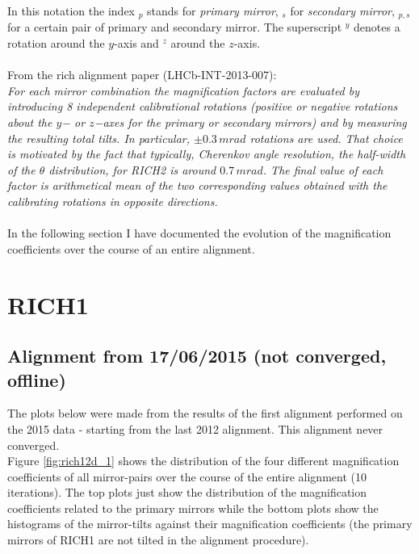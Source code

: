 In this notation the index $_p$ stands for \textit{primary mirror}, $_s$ for \textit{secondary mirror}, $_{p,s}$ for a certain pair of primary and secondary mirror. The superscript $^y$ denotes a rotation around the $y$-axis and $^z$ around the $z$-axis.\\
\\
From the rich alignment paper (LHCb-INT-2013-007):\\
\textit{For each mirror combination the magnification factors are evaluated by introducing 8 independent calibrational rotations (positive or negative rotations about the $y$− or $z$−axes for the primary or secondary mirrors) and by measuring the resulting total tilts. In particular, $\pm 0.3\, mrad$ rotations are used. That choice is motivated by the fact that typically, Cherenkov angle resolution, the half-width of the $\theta$ distribution, for RICH2 is around $0.7\, mrad$. The final value of each factor is arithmetical mean of the two corresponding values obtained with the calibrating rotations in opposite directions.}
\\
\\
In the following section I have documented the evolution of the magnification coefficients over the course of an entire alignment.\\

\section{RICH1}
\subsection{Alignment from 17/06/2015 (not converged, offline)}
The plots below were made from the results of the first alignment performed on the 2015 data - starting from the last 2012 alignment. This alignment never converged.\\
Figure \ref{fig:rich12d_1} shows the distribution of the four different magnification coefficients of all mirror-pairs over the course of the entire alignment (10 iterations). The top plots just show the distribution of the magnification coefficients related to the primary mirrors while the bottom plots show the histograms of the mirror-tilts against their magnification coefficients (the primary mirrors of RICH1 are not tilted in the alignment procedure).\\


